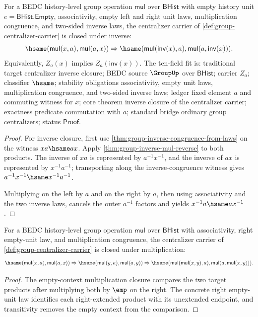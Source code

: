 \begin{theorem}
\label{thm:group-centralizer-inverse-closure}
For a BEDC history-level group operation $\mathsf{mul}$ over $\mathsf{BHist}$
with empty history unit $e=\mathsf{BHist.Empty}$, associativity, empty left
and right unit laws, multiplication congruence, and two-sided inverse laws,
the centralizer carrier of \autoref{def:group-centralizer-carrier} is closed
under inverse:
$$
\hsame(\mathsf{mul}(x,a),\mathsf{mul}(a,x))
\Rightarrow
\hsame(\mathsf{mul}(\mathsf{inv}(x),a),
\mathsf{mul}(a,\mathsf{inv}(x))).
$$
Equivalently, $Z_a(x)$ implies $Z_a(\mathsf{inv}(x))$.
The ten-field fit is: traditional target centralizer inverse closure; BEDC
source $\GroupUp$ over $\mathsf{BHist}$; carrier $Z_a$; classifier $\hsame$;
stability obligations associativity, empty unit laws, multiplication
congruence, and two-sided inverse laws; ledger fixed element $a$ and commuting
witness for $x$; core theorem inverse closure of the centralizer carrier;
exactness predicate commutation with $a$; standard bridge ordinary group
centralizers; status $\mathsf{Proof}$.
\end{theorem}
\begin{proof}
For inverse closure, first use \autoref{thm:group-inverse-congruence-from-laws}
on the witness $xa\hsame ax$. Apply
\autoref{thm:group-inverse-mul-reverse} to both products. The inverse of
$xa$ is represented by $a^{-1}x^{-1}$, and the inverse of $ax$ is represented
by $x^{-1}a^{-1}$; transporting along the inverse-congruence witness gives
$a^{-1}x^{-1}\hsame x^{-1}a^{-1}$.

Multiplying on the left by $a$ and on the right by $a$, then using
associativity and the two inverse laws, cancels the outer $a^{-1}$ factors and
yields $x^{-1}a\hsame ax^{-1}$.
\end{proof}

\begin{theorem}
\label{thm:group-centralizer-mul-closed-from-empty-unit}
For a BEDC history-level group operation $\mathsf{mul}$ over $\mathsf{BHist}$
with associativity, right empty-unit law, and multiplication congruence, the
centralizer carrier of \autoref{def:group-centralizer-carrier} is closed under
multiplication:
$$
\hsame(\mathsf{mul}(x,a),\mathsf{mul}(a,x))
\Rightarrow
\hsame(\mathsf{mul}(y,a),\mathsf{mul}(a,y))
\Rightarrow
\hsame(\mathsf{mul}(\mathsf{mul}(x,y),a),
\mathsf{mul}(a,\mathsf{mul}(x,y))).
$$
\end{theorem}
\begin{proof}
The empty-context multiplication closure compares the two target products
after multiplying both by $\emp$ on the right. The concrete right empty-unit
law identifies each right-extended product with its unextended endpoint, and
transitivity removes the empty context from the comparison.
\end{proof}

